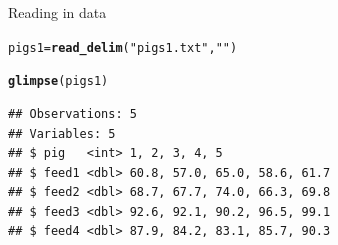 \documentclass[unknownkeysallowed]{beamer}\usepackage[]{graphicx}\usepackage[]{color}
\makeatletter
\newcommand{\hlstr}[1]{\textcolor[rgb]{0.192,0.494,0.8}{#1}}%
\newcommand{\hlstd}[1]{\textcolor[rgb]{0.345,0.345,0.345}{#1}}%
\newcommand{\hlkwb}[1]{\textcolor[rgb]{0.69,0.353,0.396}{#1}}%
\newcommand{\hlkwd}[1]{\textcolor[rgb]{0.737,0.353,0.396}{\textbf{#1}}}%
\newenvironment{kframe}{%
 \def\at@end@of@kframe{}%
 \ifinner\ifhmode%
  \def\at@end@of@kframe{\end{minipage}}%
  \begin{minipage}{\columnwidth}%
 \fi\fi%
 \def\FrameCommand##1{\hskip\@totalleftmargin \hskip-\fboxsep
 \colorbox{shadecolor}{##1}\hskip-\fboxsep
     \hskip-\linewidth \hskip-\@totalleftmargin \hskip\columnwidth}%
 \MakeFramed {\advance\hsize-\width
   \@totalleftmargin\z@ \linewidth\hsize
   \@setminipage}}%
 {\par\unskip\endMakeFramed%
 \at@end@of@kframe}
\newenvironment{knitrout}{}{} %
\makeatother
\begin{document}
\begin{frame}[fragile]{Reading in data}


  
\begin{knitrout}\small
{}\color{fgcolor}\begin{kframe}
\begin{alltt}
\hlstd{pigs1}\hlkwb{=}\hlkwd{read_delim}\hlstd{(}\hlstr{"pigs1.txt"}\hlstd{,}\hlstr{" "}\hlstd{)}
\end{alltt}


{\ttfamily\noindent\itshape\color{messagecolor}{\#\# Parsed with column specification:\\\#\# cols(\\\#\#\ \  pig = col\_integer(),\\\#\#\ \  feed1 = col\_double(),\\\#\#\ \  feed2 = col\_double(),\\\#\#\ \  feed3 = col\_double(),\\\#\#\ \  feed4 = col\_double()\\\#\# )}}\begin{alltt}
\hlkwd{glimpse}\hlstd{(pigs1)}
\end{alltt}
\begin{verbatim}
## Observations: 5
## Variables: 5
## $ pig   <int> 1, 2, 3, 4, 5
## $ feed1 <dbl> 60.8, 57.0, 65.0, 58.6, 61.7
## $ feed2 <dbl> 68.7, 67.7, 74.0, 66.3, 69.8
## $ feed3 <dbl> 92.6, 92.1, 90.2, 96.5, 99.1
## $ feed4 <dbl> 87.9, 84.2, 83.1, 85.7, 90.3
\end{verbatim}
\end{kframe}
\end{knitrout}
  
\end{frame}
\end{document}
